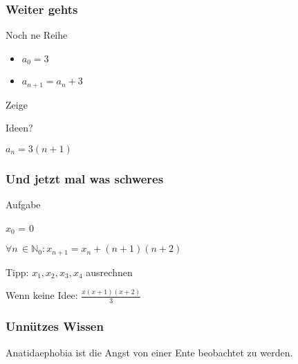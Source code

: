 \documentclass{beamer}
\begin{document}
\begin{frame}
	\frametitle{Weiter gehts}
	\begin{block}{Noch ne Reihe}
		\begin{itemize}
			\item $a_{0} = 3$
			\item $a_{n+1} = a_{n} + 3$
		\end{itemize}
	\end{block}
	\vspace{5mm}
	{
		\begin{block}{Zeige}
			\begin{itemize}
				\item Ideen?
				\visible<3->
				{
					\item $a_{n} = 3(n+1)$
				}
			\end{itemize}
		\end{block}
	}
\end{frame}

\begin{frame}
	\frametitle{Und jetzt mal was schweres}
	\begin{block}{Aufgabe }
		\begin{itemize}
			\item $x_0$ = 0 \\
			\item $\forall n \, \in \mathbb N_0 : x_{n+1} = x_n + (n+1)(n+2)$
			\item Tipp: $x_1, x_2, x_3, x_4$ ausrechnen
			\visible<2->
			{
				\item Wenn keine Idee: $ \frac{x(x+1)(x+2)}{3}$
			}
		\end{itemize}
	\end{block}
\end{frame}

\begin{frame}
	\frametitle{Unnützes Wissen}
	\begin{center}
		Anatidaephobia ist die Angst von einer Ente beobachtet zu werden.
	\end{center}
\end{frame}
\end{document}
